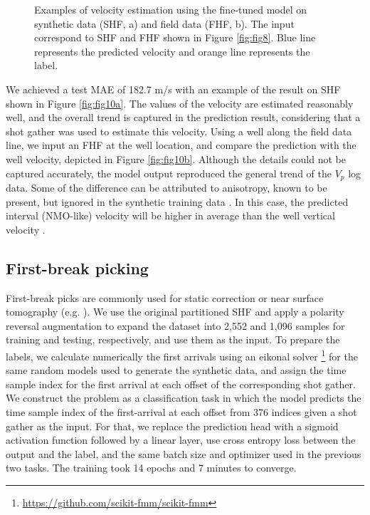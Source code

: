 \documentclass{article}
\begin{document}
\begin{figure}[h]
    \centering
    \caption{Examples of velocity estimation using the fine-tuned model on synthetic data (SHF, a) and field data (FHF, b). The input correspond to SHF and FHF shown in Figure \ref{fig:fig8}. Blue line represents the predicted velocity and orange line represents the label.}
    \label{fig:fig10}
\end{figure}

We achieved a test MAE of 182.7 m/s with an example of the result on SHF shown in Figure \ref{fig:fig10a}. The values of the velocity are estimated reasonably well, and the overall trend is captured in the prediction result, considering that a shot gather was used to estimate this velocity. Using a well along the field data line, we input an FHF at the well location, and compare the prediction with the well velocity, depicted in Figure \ref{fig:fig10b}. Although the details could not be captured accurately, the model output reproduced the general trend of the $V_p$ log data. Some of the difference can be attributed to anisotropy, known to be present, but ignored in the synthetic training data \cite{ovcharenko2021data}. In this case, the predicted interval (NMO-like) velocity will be higher in average than the well vertical velocity \cite{alkhalifah2016research}.

\subsection{First-break picking}
\label{sec:firstbreak_field}
First-break picks are commonly used for static correction or near surface tomography (e.g. \cite{waheed2021pinntomo}). We use the original partitioned SHF and apply a polarity reversal augmentation to expand the dataset into 2,552 and 1,096 samples for training and testing, respectively, and use them as the input. To prepare the labels, we calculate numerically the first arrivals using an eikonal solver \footnote{\url{https://github.com/scikit-fmm/scikit-fmm}} for the same random models used to generate the synthetic data, and assign the time sample index for the first arrival at each offset of the corresponding shot gather. We construct the problem as a classification task in which the model predicts the time sample index of the first-arrival at each offset from 376 indices given a shot gather as the input. For that, we replace the prediction head with a sigmoid activation function followed by a linear layer, use cross entropy loss between the output and the label, and the same batch size and optimizer used in the previous two tasks. The training took 14 epochs and 7 minutes to converge.
\end{document}
